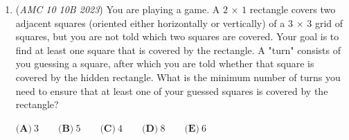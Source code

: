 \begin{enumerate}
\textbf{Solution 4}

Notice that the difference of two consecutive squares can be represented as $(x + 1) ^ 2 - x ^ 2$. Using the Difference of Squares Formula, we simplify to get $(2x + 1)(1) = 2x + 1$ The number given in the problem was 2023, and thus we find that $x = \frac{2023 - 1}{2} \Rightarrow \boxed{\text{(B) 1011}}$.

 



\textbf{Solution 5 (In Depth Explanation)}

Any two consecutive positive squares look like 
 \[n^2 \quad\text{and}\quad (n+1)^2.\]Their difference is 
 \[(n+1)^2-n^2.\]. 

 Expand:

 
 \[(n^2+2n+1)-n^2=2n+1.\]

 So the difference between consecutive squares is always an odd number: 
 \[3,5,7,9,11,\ldots\]

 For example: 
 \[3^2-2^2=9-4=5\] and 
 \[5^2-4^2=25-16=9.\].

 We need 
 \[2n+1\le2023.\]

 Subtract 1: 
 \[2n\le2022.\]

 Divide by 2: 
 \[n\le1011.\]

 Since \(n\) is a positive integer, 
 \[n=1,2,3,\ldots,1011.\]

 That's 1011 values of \(n\).

 Therefore the answer is \(\boxed{\text{B}}\).

 Key AMC trick: Whenever you see consecutive squares, immediately think

 
 \[\boxed{(n+1)^2-n^2=2n+1}.\]

 That turns what looks like a square-number problem into a simple inequality.

 


	\item (\textit{AMC 10 10B 2023}) You are playing a game. A $2$ $\times$ $1$ rectangle covers two adjacent squares (oriented either horizontally or vertically) of a $3$ $\times$ $3$ grid of squares, but you are not told which two squares are covered. Your goal is to find at least one square that is covered by the rectangle. A "turn" consists of you guessing a square, after which you are told whether that square is covered by the hidden rectangle. What is the minimum number of turns you need to ensure that at least one of your guessed squares is covered by the rectangle?


 $\textbf{(A)}\ 3 \qquad \textbf{(B)}\ 5 \qquad \textbf{(C)}\ 4 \qquad \textbf{(D)}\ 8 \qquad \textbf{(E)}\ 6$


\end{enumerate}
